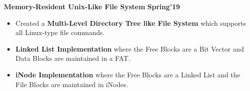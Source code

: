 \documentclass[10pt]{article}
\begin{document}
\large {\textbf{Memory-Resident Unix-Like File System}} \normalsize  \href{https://github.com/shmundhra/Systems-Programming/tree/master/File_System} {\hspace{0.5ex}\faGithub} {\hfill} \textbf{Spring'19}\\[-1.75em]
\begin{itemize}
    \item Created a \textbf{Multi-Level Directory Tree like File System} which supports all Linux-type file commands.\\[-1.9em]
    \item \textbf{Linked List Implementation} where the {Free Blocks are a Bit Vector} and {Data Blocks are maintained in a FAT}.\\[-1.9em]
    \item \textbf{iNode Implementation} where the {Free Blocks are a Linked List}  and the {File Blocks are maintained in iNodes}.\\[-1em]
\end{itemize}
\end{document}
